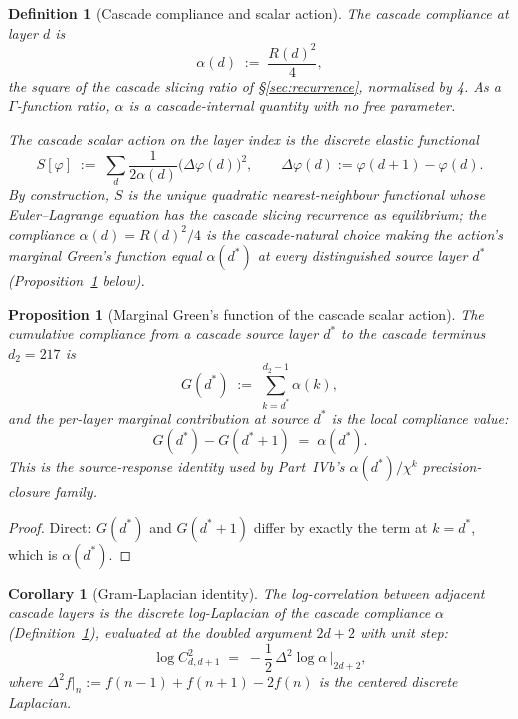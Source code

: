 \documentclass[11pt,a4paper]{article}
\newtheorem{corollary}[theorem]{Corollary}
\newtheorem{proposition}[theorem]{Proposition}
\newtheorem{definition}[theorem]{Definition}
\begin{document}
\begin{definition}[Cascade compliance and scalar action]\label{def:compliance-action}
The \emph{cascade compliance} at layer $d$ is
\[
\alpha(d) \;:=\; \frac{R(d)^2}{4},
\]
the square of the cascade slicing ratio of \S\ref{sec:recurrence}, normalised by 4. As a $\Gamma$-function ratio, $\alpha$ is a cascade-internal quantity with no free parameter.

The \emph{cascade scalar action} on the layer index is the discrete elastic functional
\[
S[\varphi] \;:=\; \sum_d \frac{1}{2\alpha(d)}\bigl(\Delta\varphi(d)\bigr)^2,
\qquad \Delta\varphi(d) := \varphi(d+1) - \varphi(d).
\]
By construction, $S$ is the unique quadratic nearest-neighbour functional whose Euler--Lagrange equation has the cascade slicing recurrence as equilibrium; the compliance $\alpha(d) = R(d)^2/4$ is the cascade-natural choice making the action's marginal Green's function equal $\alpha(d^*)$ at every distinguished source layer $d^*$ (Proposition~\ref{prop:marginal-greens} below).
\end{definition}

\begin{proposition}[Marginal Green's function of the cascade scalar action]\label{prop:marginal-greens}
The cumulative compliance from a cascade source layer $d^*$ to the cascade terminus $d_2 = 217$ is
\[
G(d^*) \;:=\; \sum_{k = d^*}^{d_2 - 1} \alpha(k),
\]
and the per-layer marginal contribution at source $d^*$ is the local compliance value:
\[
G(d^*) - G(d^* + 1) \;=\; \alpha(d^*).
\]
This is the source-response identity used by Part~IVb's $\alpha(d^*)/\chi^k$ precision-closure family.
\end{proposition}

\begin{proof}
Direct: $G(d^*)$ and $G(d^* + 1)$ differ by exactly the term at $k = d^*$, which is $\alpha(d^*)$.
\end{proof}

\begin{corollary}[Gram-Laplacian identity]\label{cor:gram-laplacian}
The log-correlation between adjacent cascade layers is the discrete log-Laplacian of the cascade compliance $\alpha$ (Definition~\ref{def:compliance-action}), evaluated at the doubled argument $2d+2$ with unit step:
\begin{equation}\label{eq:gram-laplacian}
\log C^2_{d,d+1} \;=\; -\frac{1}{2}\,\Delta^2 \log\alpha\,\Big|_{2d+2},
\end{equation}
where $\Delta^2 f|_n := f(n-1) + f(n+1) - 2f(n)$ is the centered discrete Laplacian.
\end{corollary}
\end{document}
